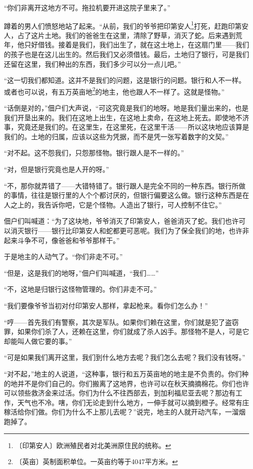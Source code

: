 \documentclass[12pt,UTF-8,openany]{ctexbook}
\begin{document}
    “你们非离开这地方不可。拖拉机要开进这院子里来了。”
    
    蹲着的男人们愤怒地站了起来。“从前，我们的爷爷把印第安人\footnote{〔印第安人〕欧洲殖民者对北美洲原住民的统称。}打死，赶跑印第安人，占了这片土地。我们的爸爸生在这里，清除了野草，消灭了蛇。后来遇到荒年，他只好借钱。接着是我们，我们出生了，就在这土地上，在这扇门里——我们的孩子也是在这儿出生的。然后我们又必须借钱。最后，土地归了银行，可是我们还留在这里，我们种出的东西，我们多少可以分一点儿吧。”
    
    “这一切我们都知道。这并不是我们的问题，这是银行的问题。银行和人不一样。或者也可以说，有五万英亩地\footnote{〔英亩〕英制面积单位。一英亩约等于4047平方米。}的地主，他也跟人不一样了。这就是怪物。”
    
    “话倒是对的，”佃户们大声说，“可这究竟是我们的地呀。地是我们量出来的，也是我们开垦出来的。我们在这地上出生，在这地上卖命，在这地上死去。即使地不济事，究竟还是我们的。在这里生，在这里死，在这里干活——所以这块地应该算是我们的。土地的归属，应该以这些为凭据，而不是凭一张写着数字的文契。”
    
    “对不起。这不怨我们，只怨那怪物。银行跟人是不一样的。”
    
    “对，但是银行究竟也是人开的呀。”
    
    “不，那你就弄错了——大错特错了。银行跟人是完全不同的一种东西。银行所做的事情，往往是银行里的人个个都讨厌的，但银行偏要这么做。银行这种东西是在人之上的，我告诉你吧，它是个怪物。人造出了银行，可人控制不住它。”
    
    佃户们叫喊道：“为了这块地，爷爷消灭了印第安人，爸爸消灭了蛇。我们也许可以消灭银行——银行比印第安人和蛇都更可恶呢。我们为了保全我们的地，也许非起来斗争不可，像爸爸和爷爷那样干。”
    
    于是地主的人动气了。“你们非走不可。”
    
    “但是，这是我们的地呀，”佃户们叫喊道，“我们……”
    
    “不，这地是归银行这怪物管理的。你们非走不可。”
    
    “我们要像爷爷当初对付印第安人那样，拿起枪来。看你们怎么办！”
    
    “哼——首先我们有警察，其次是军队。如果你们赖在这里，你们就是犯了盗窃罪，如果你们杀了人，还赖在这里，你们就成了杀人凶手。那怪物不是人，可是它却能叫人做它要的事。”
    
    “可是如果我们离开这里，我们到什么地方去呢？我们怎么去呢？我们没有钱呀。”
    
    “对不起，”地主的人说道，“这种事，银行和五万英亩地的地主是不负责的。你们种的地并不是你们自己的。你们搬离了这地界，也许可以在秋天摘摘棉花。你们也许可以领些救济金来过活。你们为什么不往西部去，到加利福尼亚去呢？那边有工作，天气也不冷。嗐，你们无论走到什么地方，一伸手就可以摘到橙子。经常有庄稼活给你们做。你们为什么不上那儿去呢？”说完，地主的人就开动汽车，一溜烟跑掉了。
    
\end{document}
